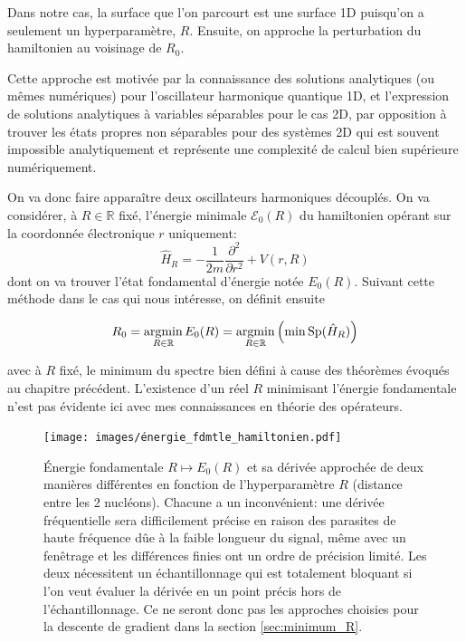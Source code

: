 \documentclass[svgnames,dvipsnames,a4paper,10pt,french]{report}
\begin{document}
Dans notre cas, la surface que l'on parcourt est une surface 1D puisqu'on a seulement un hyperparamètre, $R$. Ensuite, on approche la perturbation du hamiltonien au voisinage de $R_0$. 


Cette approche est motivée par la connaissance des solutions analytiques (ou mêmes numériques) pour l'oscillateur harmonique quantique 1D, et l'expression de solutions analytiques à variables séparables pour le cas 2D, par opposition à trouver les états propres non séparables pour des systèmes 2D qui est souvent impossible analytiquement et représente une complexité de calcul bien supérieure numériquement.




On va donc faire apparaître deux oscillateurs harmoniques découplés. On va considérer, à $R\in \mathbb{R}$ fixé, l'énergie minimale $\mathcal{E}_0(R)$ du hamiltonien opérant sur la coordonnée électronique $r$ uniquement:
\begin{equation}
    \hat{H}_R = -\frac{1}{2m} \frac{\partial^2}{\partial r^2} + V(r,R)
\end{equation}
dont on va trouver l'état fondamental d'énergie notée $E_0(R)$.  Suivant cette méthode dans le cas qui nous intéresse, on définit ensuite

\begin{equation}
    R_0 = \argmin_{R\in\mathbb{R}} E_0(R) = \argmin_{R\in\mathbb{R}} \left( \min \text{Sp}(\hat{H}_R) \right)
\end{equation}

avec à $R$ fixé, le minimum du spectre bien défini à cause des théorèmes évoqués au chapitre précédent. L'existence d'un réel $R$ minimisant l'énergie fondamentale  n'est pas évidente ici avec mes connaissances en théorie des opérateurs. 

\begin{figure}
    \centering
    \texttt{[image: images/énergie\_fdmtle\_hamiltonien.pdf]}
    \caption[Énergie fondamentale $R\mapsto E_0(R)$ et sa dérivée approchée de deux manières différentes.]{Énergie fondamentale $R\mapsto E_0(R)$ et sa dérivée approchée de deux manières différentes en fonction de l'hyperparamètre $R$ (distance entre les 2 nucléons). Chacune a un inconvénient: une dérivée fréquentielle sera difficilement précise en raison des parasites de haute fréquence dûe à la faible longueur du signal, même avec un fenêtrage et les différences finies ont un ordre de précision limité. Les deux nécessitent un échantillonnage qui est totalement bloquant si l'on veut évaluer la dérivée en un point précis hors de l'échantillonnage. Ce ne seront donc pas les approches choisies pour la descente de gradient dans la section \ref{sec:minimum_R}.}
    \label{fig:energie_fdtle_ham}
\end{figure}
\end{document}

